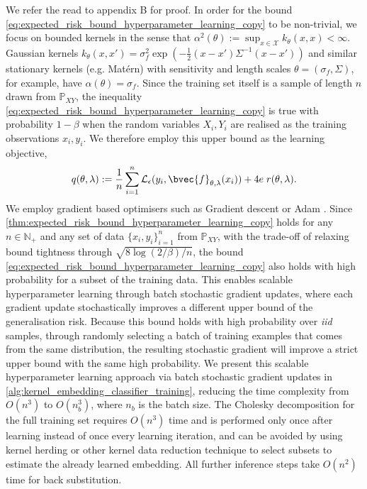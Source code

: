 \documentclass{article}
\begin{document}
	We refer the read to appendix B for proof. In order for the bound \eqref{eq:expected_risk_bound_hyperparameter_learning_copy} to be non-trivial, we focus on bounded kernels in the sense that $\alpha^{2}(\theta) := \sup_{x \in \mathcal{X}} k_{\theta}(x, x) < \infty$. Gaussian kernels $k_{\theta}(x, x') = \sigma_{f}^{2} \exp{( - \frac{1}{2}(x - x') \Sigma^{-1} (x - x') )}$ and similar stationary kernels (e.g. Mat\'{e}rn) with sensitivity and length scales $\theta = (\sigma_{f}, \Sigma)$, for example, have $\alpha(\theta) = \sigma_{f}$. Since the training set itself is a sample of length $n$ drawn from $\mathbb{P}_{X Y}$, the inequality \eqref{eq:expected_risk_bound_hyperparameter_learning_copy} is true with probability $1 - \beta$ when the random variables $X_{i}, Y_{i}$ are realised as the training observations $x_{i}, y_{i}$. We therefore employ this upper bound as the learning objective,
	\begin{equation}
		q(\theta, \lambda) := \frac{1}{n} \sum_{i = 1}^{n} \mathcal{L}_{\epsilon}(y_{i}, \bvec{f}_{\theta, \lambda}(x_{i})) + 4 e \; r(\theta, \lambda).
	\label{eq:learning_objective}
	\end{equation}
	We employ gradient based optimisers such as Gradient descent or Adam \citep{kingma2014adam}. Since \cref{thm:expected_risk_bound_hyperparameter_learning_copy} holds for any $n \in \mathbb{N}_{+}$ and any set of data $\{x_{i}, y_{i}\}_{i = 1}^{n}$ from $\mathbb{P}_{X Y}$, with the trade-off of relaxing bound tightness through $\sqrt{8 \log{(2 / \beta)} / n}$, the bound \eqref{eq:expected_risk_bound_hyperparameter_learning_copy} also holds with high probability for a subset of the training data. This enables scalable hyperparameter learning through batch stochastic gradient updates, where each gradient update stochastically improves a different upper bound of the generalisation risk. Because this bound holds with high probability over \textit{iid} samples, through randomly selecting a batch of training examples that comes from the same distribution, the resulting stochastic gradient will improve a strict upper bound with the same high probability. We present this scalable hyperparameter learning approach via batch stochastic gradient updates in \cref{alg:kernel_embedding_classifier_training}, reducing the time complexity from $O(n^{3})$ to $O(n_{b}^{3})$, where $n_{b}$ is the batch size. The Cholesky decomposition for the full training set requires $O(n^{3})$ time and is performed only once after learning instead of once every learning iteration, and can be avoided by using kernel herding \citep{chen2010super} or other kernel data reduction technique to select subsets to estimate the already learned embedding. All further inference steps take $O(n^{2})$ time for back substitution. 
	
\end{document}
